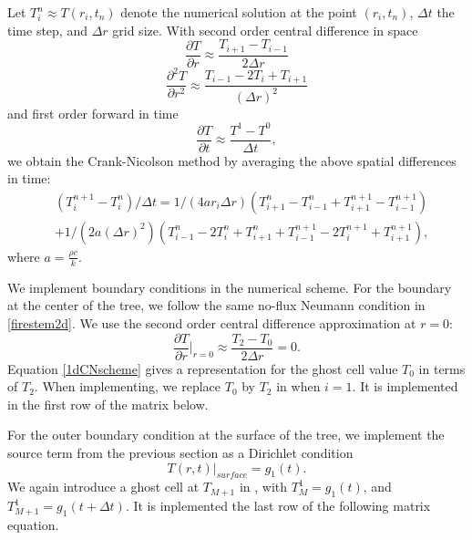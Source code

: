 \documentclass[12pt]{article}
\begin{document}
Let $T^n_{i} \approx T(r_i,t_n)$ denote the numerical solution at the point $(r_i,t_n)$, $\Delta t$ the time step, and $\Delta r$ grid size. 
With second order central difference in space 
\begin{equation}\frac{\partial T}{\partial r}\approx\frac{T_{i+1}-T_{i-1}}{2\Delta r}\end{equation}
\begin{equation}\frac{\partial^2 T}{\partial r^2}\approx\frac{T_{i-1}-2T_{i}+T_{i+1}}{(\Delta r)^2}\end{equation}
and first order forward in time
\begin{equation}\frac{\partial T}{\partial t}\approx\frac{T^1-T^0}{\Delta t},\end{equation}
we obtain the Crank-Nicolson method by averaging the above spatial differences in time:
\begin{align}
&(T^{n+1}_i - T^n_i)/\Delta t = 1/(4ar_i\Delta r)(T^n_{i+1}-T^n_{i-1} + T^{n+1}_{i+1}-T^{n+1}_{i-1} )\nonumber\\
&+1/(2a(\Delta r)^2)(T^n_{i-1} - 2T^n_i + T^n_{i+1} + T^{n+1}_{i-1} - 2T^{n+1}_i + T^{n+1}_{i+1}),\label{1dCNscheme}
\end{align}
where $a = \frac{\rho c}{k}$.

We implement boundary conditions in the numerical scheme. For the boundary at the center of the tree, we follow the same no-flux Neumann condition in \ref{firestem2d}. We use the second order central difference approximation at $r=0$: 
\begin{equation}
    \frac{\partial T}{\partial r}\bigg|_{r=0}\approx \frac{T_2-T_0}{2\Delta r}=0.
\end{equation} %
Equation \eqref{1dCNscheme} gives a representation for the ghost cell value $T_0$ in terms of $T_2$. When implementing, we replace $T_0$ by $T_2$ in \label{1dCNscheme} when $i=1$. It is implemented in the first row of the matrix below. 

For the outer boundary condition at the surface of the tree, we implement the source term from the previous section as a Dirichlet condition
\begin{equation}
    T(r,t)\bigg|_{surface}=g_1(t).
\end{equation}
We again introduce a ghost cell at $T_{M+1}$ in \label{1dCNscheme}, with $T^1_{M} = g_1(t)$, and $T^1_{M+1} = g_1(t+\Delta t)$.  
It is inplemented the last row of the following matrix equation.
\end{document}
